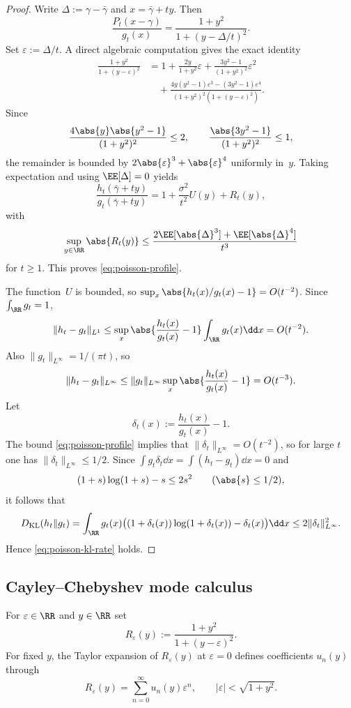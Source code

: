 \begin{proof}
Write $\Delta:=\gamma-\bar\gamma$ and $x=\bar\gamma+ty$.  Then
\[
\frac{P_t(x-\gamma)}{g_t(x)}
=\frac{1+y^{2}}{1+(y-\Delta/t)^{2}}.
\]
Set $\varepsilon:=\Delta/t$.  A direct algebraic computation gives the
exact identity
\begin{align*}
\frac{1+y^{2}}{1+(y-\varepsilon)^{2}}
&=1+\frac{2y}{1+y^{2}}\varepsilon
+\frac{3y^{2}-1}{(1+y^{2})^{2}}\varepsilon^{2} \\
&\quad
+\frac{4y(y^{2}-1)\varepsilon^{3}-(3y^{2}-1)\varepsilon^{4}}
{(1+y^{2})^{2}(1+(y-\varepsilon)^{2})}.
\end{align*}
Since
\[
\frac{4\abs{y}\abs{y^{2}-1}}{(1+y^{2})^{2}}\le 2,
\qquad
\frac{\abs{3y^{2}-1}}{(1+y^{2})^{2}}\le 1,
\]
the remainder is bounded by $2\abs{\varepsilon}^{3}+\abs{\varepsilon}^{4}$
uniformly in~$y$.  Taking expectation and using $\EE[\Delta]=0$ yields
\[
\frac{h_t(\bar\gamma+ty)}{g_t(\bar\gamma+ty)}
=1+\frac{\sigma^{2}}{t^{2}}U(y)+R_t(y),
\]
with
\[
\sup_{y\in\RR}\abs{R_t(y)}
\le \frac{2\EE[\abs{\Delta}^{3}]+\EE[\abs{\Delta}^{4}]}{t^{3}}
\]
for $t\ge 1$.  This proves \eqref{eq:poisson-profile}.

The function~$U$ is bounded, so
$\sup_x\abs{h_t(x)/g_t(x)-1}=O(t^{-2})$.  Since $\int_{\RR}g_t=1$,
\[
\|h_t-g_t\|_{L^1}
\le \sup_{x}\abs{\frac{h_t(x)}{g_t(x)}-1}\int_{\RR}g_t(x)\dd x
=O(t^{-2}).
\]
Also $\|g_t\|_{L^\infty}=1/(\pi t)$, so
\[
\|h_t-g_t\|_{L^\infty}
\le \|g_t\|_{L^\infty}\sup_{x}\abs{\frac{h_t(x)}{g_t(x)}-1}
=O(t^{-3}).
\]
Let
\[
\delta_t(x):=\frac{h_t(x)}{g_t(x)}-1.
\]
The bound \eqref{eq:poisson-profile} implies that
$\|\delta_t\|_{L^\infty}=O(t^{-2})$, so for large $t$ one has
$\|\delta_t\|_{L^\infty}\le 1/2$.  Since
$\int g_t\delta_t\dd x=\int(h_t-g_t)\dd x=0$ and
\[
(1+s)\log(1+s)-s\le 2s^{2}
\qquad(\abs{s}\le 1/2),
\]
it follows that
\[
D_{\mathrm{KL}}(h_t\|g_t)
=\int_{\RR}g_t(x)\bigl((1+\delta_t(x))\log(1+\delta_t(x))-\delta_t(x)\bigr)\dd x
\le 2\|\delta_t\|_{L^\infty}^{2}.
\]
Hence \eqref{eq:poisson-kl-rate} holds.
\end{proof}

\subsection{Cayley--Chebyshev mode calculus}

For $\varepsilon\in\RR$ and $y\in\RR$ set
\begin{equation}\label{eq:cayley-comparison-kernel}
R_\varepsilon(y):=\frac{1+y^2}{1+(y-\varepsilon)^2}.
\end{equation}
For fixed $y$, the Taylor expansion of $R_\varepsilon(y)$ at
$\varepsilon=0$ defines coefficients $u_n(y)$ through
\begin{equation}\label{eq:cayley-mode-series}
R_\varepsilon(y)=\sum_{n=0}^{\infty}u_n(y)\varepsilon^n,
\qquad
|\varepsilon|<\sqrt{1+y^2}.
\end{equation}

